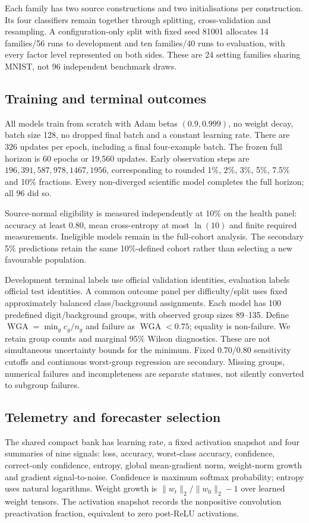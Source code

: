 \documentclass[nolineno]{ieeeaccess}
\newcommand{\WGA}{\operatorname{WGA}}
\begin{document}
Each family has two source constructions and two initialisations per construction. Its four classifiers remain together through splitting, cross-validation and resampling. A configuration-only split with fixed seed 81001 allocates 14 families/56 runs to development and ten families/40 runs to evaluation, with every factor level represented on both sides. These are 24 setting families sharing MNIST, not 96 independent benchmark draws.

\subsection{Training and terminal outcomes}
All models train from scratch with Adam betas $(0.9,0.999)$, no weight decay, batch size 128, no dropped final batch and a constant learning rate. There are 326 updates per epoch, including a final four-example batch. The frozen full horizon is 60 epochs or 19,560 updates. Early observation steps are $196,391,587,978,1467,1956$, corresponding to rounded 1\%, 2\%, 3\%, 5\%, 7.5\% and 10\% fractions. Every non-diverged scientific model completes the full horizon; all 96 did so.

Source-normal eligibility is measured independently at 10\% on the health panel: accuracy at least $0.80$, mean cross-entropy at most $\ln(10)$ and finite required measurements. Ineligible models remain in the full-cohort analysis. The secondary 5\% predictions retain the same 10\%-defined cohort rather than selecting a new favourable population.

Development terminal labels use official validation identities, evaluation labels official test identities. A common outcome panel per difficulty/split uses fixed approximately balanced class/background assignments. Each model has 100 predefined digit/background groups, with observed group sizes 89--135. Define $\WGA=\min_g c_g/n_g$ and failure as $\WGA<0.75$; equality is non-failure. We retain group counts and marginal 95\% Wilson diagnostics. These are not simultaneous uncertainty bounds for the minimum. Fixed 0.70/0.80 sensitivity cutoffs and continuous worst-group regression are secondary. Missing groups, numerical failures and incompleteness are separate statuses, not silently converted to subgroup failures.

\subsection{Telemetry and forecaster selection}
The shared compact bank has learning rate, a fixed activation snapshot and four summaries of nine signals: loss, accuracy, worst-class accuracy, confidence, correct-only confidence, entropy, global mean-gradient norm, weight-norm growth and gradient signal-to-noise. Confidence is maximum softmax probability; entropy uses natural logarithms. Weight growth is $\|w_t\|_2/\|w_0\|_2-1$ over learned weight tensors. The activation snapshot records the nonpositive convolution preactivation fraction, equivalent to zero post-ReLU activations.
\end{document}
